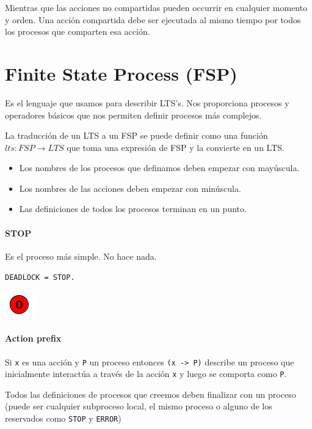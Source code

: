 Mientras que las acciones no compartidas pueden occurrir en cualquier momento y orden. Una acción compartida debe ser ejecutada al mismo tiempo por todos los procesos que comparten esa acción.

\newpage
\section{Finite State Process (FSP)}
Es el lenguaje que usamos para describir LTS's. Nos proporciona procesos y operadores básicos que nos permiten definir procesos más complejos.

La traducción de un LTS a un FSP se puede definir como una función
$lts : FSP \to LTS$ que toma una expresión de FSP y la convierte en un LTS.

\begin{itemize}
\item Los nombres de los procesos que definamos deben empezar con mayúscula.
\item Los nombres de las acciones deben empezar con minúscula.
\item Las definiciones de todos los procesos terminan en un punto.

\end{itemize}

\paragraph{STOP} 
Es el proceso más simple. No hace nada.
\begin{center}
\begin{minipage}{0.25\textwidth}
\texttt{DEADLOCK = STOP.}
\end{minipage}
\begin{minipage}{0.25\textwidth}
	\includegraphics[scale=1]{imagenes/lts-deadlock}
\end{minipage}
\end{center}
\paragraph{Action prefix}
Si \texttt{x} es una acción y \texttt{P} un proceso entonces \texttt{(x -> P)} describe un proceso que inicialmente interactúa a través de la acción \texttt{x} y luego se comporta como \texttt{P}.

Todos las definiciones de procesos que creemos deben finalizar con un proceso (puede ser cualquier subproceso local, el mismo proceso o alguno de los reservados como \texttt{STOP} y \texttt{ERROR})


